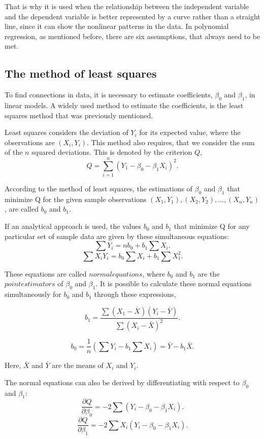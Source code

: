 \noindent That is why it is used when the relationship between the independent variable and the dependent variable is better represented by a curve rather than a straight line, since it can show the nonlinear patterns in the data.
In polynomial regression, as mentioned before, there are six assumptions, that always need to be met.


\subsection{The method of least squares}
To find connections in data, it is necessary to estimate coefficients, $\beta_0$ and $\beta_1$, in linear models. 
A widely used method to estimate the coefficients, is the least squares method that was previously mentioned. 

\noindent Least squares considers the deviation of $Y_i$ for  its expected value, where the observations are $(X_i, Y_i)$. 
This method also requires, that we consider the sum of the $n$ squared deviations.
This is denoted by the criterion $Q$,
$$Q=\sum_{i=1}^{n}(Y_1-\beta_0 - \beta_1 X_i)^2 .$$
 
\noindent According to the method of least squares, the estimations of $\beta_0$ and $\beta_1$ that minimize Q for the given sample observations $(X_1,Y_1), (X_2,Y_2), ..., (X_n,Y_n)$, are called $b_0$ and $b_1$.  

\noindent If an analytical approach is used, the values $b_0$ and $b_1$ that minimize Q for any particular set of sample data are given by these simultaneous equations: 
$$\sum Y_i =n b_0 +b_1 \sum X_i .$$
$$\sum X_i Y_i = b_0 \sum X_i + b_1 \sum X_1^2 .$$

\noindent These equations are called $normal equations$, where $b_0$ and $b_1$ are the $point estimators$ of $\beta_0$ and $\beta_1$. It is possible to calculate these normal equations simultaneously for $b_0$ and $b_1$ through these expressions,

$$b_1 = \frac{\sum (X_1 - \bar{X}) (Y_i - \bar{Y})}{\sum (X_i - \bar{X})^2} .$$

$$b_0 = \frac{1}{n} (\sum Y_i - b_1 \sum X_i ) = \bar{Y} - b_1 \bar{X} .$$

\noindent Here, $\bar{X}$ and $\bar{Y}$ are the means of $X_i$ and $Y_i$.

\noindent The normal equations can also be derived by differentiating with respect to $\beta_0$ and $\beta_1$:
$$\frac{\partial Q}{\partial \beta_0}=-2 \sum (Y_i - \beta_0 - \beta_1 X_i) .$$
$$\frac{\partial Q} {\partial \beta_1} = -2 \sum X_i (Y_i - \beta_0 - \beta_1 X_i) .$$

